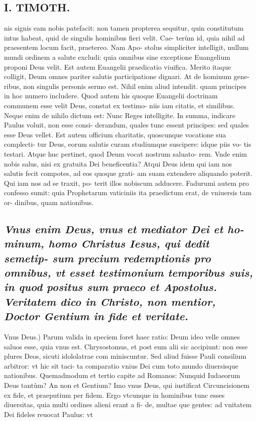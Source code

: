 \documentclass{article}
\begin{document}
\begin{pages}
\section*{I. TIMOTH. }
\marginpar{[ p.20 ]}\pstart nis signis eam nobis patefacit: non tamen propterea sequitur, quin constitutum intus habeat, quid de singulis hominibus fieri velit. Cae- terùm id, quia nihil ad praesentem locum facit, praetereo. Nam Apo- stolus simpliciter intelligit, nullum mundi ordinem a salute excludi: quia omnibus sine exceptione Euangelium proponi Deus velit. Est autem Euangelii praedicatio viuifica. Merito itaque colligit, Deum omnes pariter salutis participatione dignari. At de hominum gene- ribus, non singulis personis sermo est. Nihil enim aliud intendit. quam principes in hoc numero includere. Quod autem his quoque Euangelii doctrinam communem esse velit Deus, constat ex testimo- niis iam citatis, et similibus. Neque enim de nihilo dictum est: Nunc Reges intelligite. In summa, indicare Paulus voluit, non esse consi- derandum, quales tunc essent principes: sed quales esse Deus vellet. Est autem officium charitatis, quoscunque vocatione sua complecti- tur Deus, eorum salutis curam studiumque suscipere: idque piis vo- tis testari. Atque huc pertinet, quod Deum vocat nostrum saluato- rem. Vnde enim nobis salus, nisi ex gratuita Dei beneficentia? Atqui Deus idem qui iam nos salutis fecit compotes, ad eos quoque grati- am suam extendere aliquando poterit. Qui iam nos ad se traxit, po- terit illos nobiscum adducere. Fadurumi autem pro confesso sumit: quia Prophetarum vaticiniis ita praedictum erat, de vniuersis tam or- dinibus, quam nationibus.  \pend
{}
{}
\subsection*{\textit{Vnus enim Deus, vnus et mediator Dei et ho- minum, homo Christus Iesus, qui dedit semetip- sum precium redemptionis pro omnibus, vt esset testimonium temporibus suis, in quod positus sum praeco et Apostolus. Veritatem dico in Christo, non mentior, Doctor Gentium in fide et veritate. }}\pstart Vnus Deus.) Parum valida in speciem foret haec ratio: Deum ideo velle omnes saluos esse, quia vnus est. Chrysostomus, et post eum alii sic accipiunt: non esse plures Deos, sicuti idololatrae com miniscuntur. Sed aliud fuisse Pauli consilium arbitror: vt hic sit taci- ta comparatio vnius Dei cum toto mundo diuersisque nationibus. Quemadmodum et tertio capite ad Romanos: Nunquid Iudaeorum Deus tantùm? An non et Gentium? Imo vnus Deus, qui iustificat Circuncisionem ex fide, et praeputium per fidem. Ergo vtcunque in hominibus tunc esses diuersitas, quia multi ordines alieni erant a fi- de, multae que gentes: ad vnitatem Dei fideles reuocat Paulus: vt  \pend

\end{pages}
\end{document}
